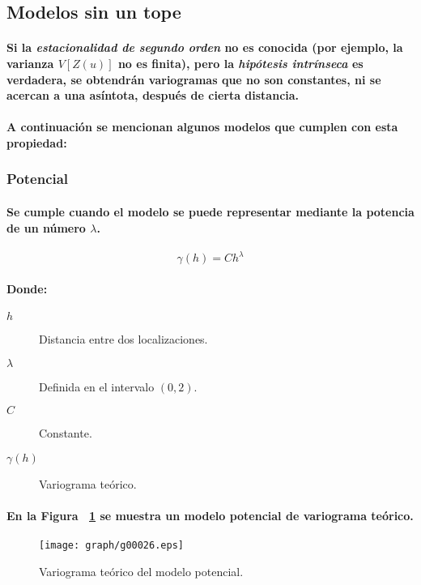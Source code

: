 \subsection{Modelos sin un tope}
\paragraph{
Si la \emph{estacionalidad de segundo orden} no es conocida (por ejemplo, la varianza $V[Z(u)]$ no es finita), pero la \emph{hipótesis intrínseca} es verdadera, se obtendrán variogramas que no son constantes, ni se acercan a una asíntota, después de cierta distancia.
}
\paragraph{
A continuación se mencionan algunos modelos que cumplen con esta propiedad:
}

\subsubsection{Potencial}
\paragraph{
Se cumple cuando el modelo se puede representar mediante la potencia de un número $\lambda$.
}
\begin{equation}
\gamma(h) = C h^\lambda
\end{equation}
\paragraph{
Donde:
}
\begin{description}
\item[$h$] Distancia entre dos localizaciones.
\item[$\lambda$] Definida en el intervalo $(0,2)$.
\item[$C$] Constante.
\item[$\gamma(h)$] Variograma teórico.
\end{description}
\paragraph{
En la Figura ~\ref{fig:VariogramaTeoricoModeloPotencial} se muestra un modelo potencial de variograma teórico.
}
\begin{figure}[ht]
\centering
\texttt{[image: graph/g00026.eps]}
\caption[Variograma teórico del modelo potencial.]{Variograma teórico del modelo potencial.}
\label{fig:VariogramaTeoricoModeloPotencial}
\end{figure}

